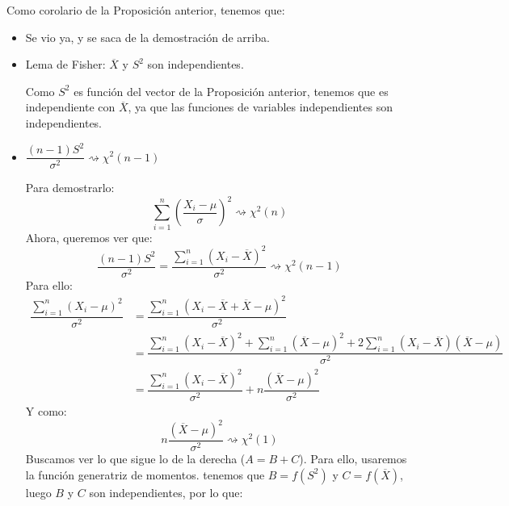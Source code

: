 \begin{coro}
    Como corolario de la Proposición anterior, tenemos que:
    \begin{itemize}
        \item Se vio ya, y se saca de la demostración de arriba.
        \item Lema de Fisher: $\overline{X}$ y $S^2$ son independientes.

            Como $S^2$ es función del vector de la Proposición anterior, tenemos que es independiente con $\overline{X}$, ya que las funciones de variables independientes son independientes.
        \item $\dfrac{(n-1)S^2}{\sigma^2}\rightsquigarrow\chi^{2}(n-1)$

            Para demostrarlo:
            \begin{equation*}
                \sum\limits_{i=1}^n{\left(\dfrac{X_i - \mu}{\sigma}\right)}^{2} \rightsquigarrow\chi^2(n)
            \end{equation*}
            Ahora, queremos ver que:
            \begin{equation*}
                \dfrac{(n-1)S^2}{\sigma^2} = \dfrac{\sum\limits_{i=1}^n {(X_i - \overline{X})}^{2}}{\sigma^2} \rightsquigarrow\chi^2(n-1)
            \end{equation*}
            Para ello:
            \begin{align*}
                \dfrac{\sum\limits_{i=1}^n {(X_i - \mu)}^{2}}{\sigma^2} &= \dfrac{\sum\limits_{i=1}^n{(X_i - \overline{X} + \overline{X} - \mu)}^{2}}{\sigma^2} \\ 
                &= \dfrac{\sum\limits_{i=1}^n {(X_i - \overline{X})}^{2} + \sum\limits_{i=1}^n {(\overline{X}-\mu)}^{2} + 2\sum\limits_{i=1}^n (X_i - \overline{X})(\overline{X} - \mu)}{\sigma^2} \\
                &= \dfrac{\sum\limits_{i=1}^n {(X_i - \overline{X})}^{2} }{\sigma^2} + n \dfrac{{(\overline{X}-\mu)}^{2}}{\sigma^2}
            \end{align*}
            Y como:
            \begin{equation*}
                n \dfrac{{(\overline{X}-\mu)}^{2}}{\sigma^2} \rightsquigarrow\chi^2(1)
            \end{equation*}
            Buscamos ver lo que sigue lo de la derecha ($A=B+C$). Para ello, usaremos la función generatriz de momentos. tenemos que $B = f(S^2)$ y $C = f(\overline{X})$, luego $B$ y $C$ son independientes, por lo que:
            \begin{equation*}

\end{equation*}
\end{itemize}
\end{coro}
